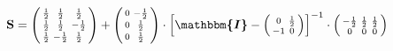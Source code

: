 \documentclass[10pt]{article} \usepackage{amsmath} \usepackage{bbold}
\begin{document}
\[ \mathbf{S} = \left(\begin{smallmatrix} \frac{1}{2} & \frac{1}{2} &
\frac{1}{2} \\ \frac{1}{2} & \frac{1}{2} & -\frac{1}{2} \\ \frac{1}{2}
& -\frac{1}{2} & \frac{1}{2} \end{smallmatrix}\right) +
\left(\begin{smallmatrix} 0 & -\frac{1}{2} \\ 0 & \frac{1}{2} \\ 0 &
\frac{1}{2} \end{smallmatrix}\right) \cdot \left[
\boldsymbol{\mathbbm{I}}  - \left(\begin{smallmatrix} 0 & \frac{1}{2}
\\ -1 & 0 \end{smallmatrix}\right) \right]^{-1}
\cdot\left(\begin{smallmatrix} -\frac{1}{2} & \frac{1}{2} &
\frac{1}{2} \\ 0 & 0 & 0 \end{smallmatrix}\right) \]
\end{document}
